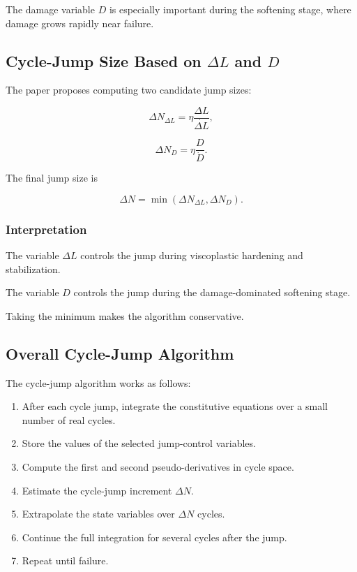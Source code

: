 ﻿\documentclass[11pt,a4paper]{article}
\begin{document}
The damage variable $D$ is especially important during the softening stage, where damage grows rapidly near failure.

\subsection{Cycle-Jump Size Based on $\Delta L$ and $D$}

The paper proposes computing two candidate jump sizes:

\[
\Delta N_{\Delta L}
=
\eta
\frac{\Delta L}{\dot{\Delta L}},
\]

\[
\Delta N_D
=
\eta
\frac{D}{\dot{D}}.
\]

The final jump size is

\[
\Delta N
=
\min
\left(
\Delta N_{\Delta L},
\Delta N_D
\right).
\]

\subsubsection*{Interpretation}

The variable $\Delta L$ controls the jump during viscoplastic hardening and stabilization.

The variable $D$ controls the jump during the damage-dominated softening stage.

Taking the minimum makes the algorithm conservative.

\subsection{Overall Cycle-Jump Algorithm}

The cycle-jump algorithm works as follows:

\begin{enumerate}[leftmargin=*]
    \item After each cycle jump, integrate the constitutive equations over a small number of real cycles.
    \item Store the values of the selected jump-control variables.
    \item Compute the first and second pseudo-derivatives in cycle space.
    \item Estimate the cycle-jump increment $\Delta N$.
    \item Extrapolate the state variables over $\Delta N$ cycles.
    \item Continue the full integration for several cycles after the jump.
    \item Repeat until failure.
\end{enumerate}
\end{document}
